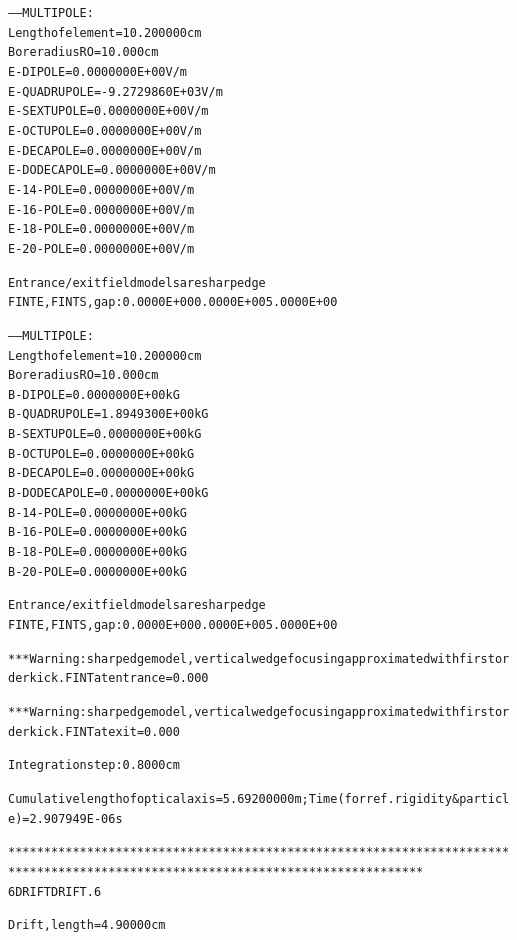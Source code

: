 \begin{tiny}
\begin{center}
\begin{alltt}
      -----  MULTIPOLE   : 
                Length  of  element  =    10.200000      cm
                Bore  radius      RO =    10.000      cm
               E-DIPOLE      =  0.0000000E+00 V/m
               E-QUADRUPOLE  = -9.2729860E+03 V/m
               E-SEXTUPOLE   =  0.0000000E+00 V/m
               E-OCTUPOLE    =  0.0000000E+00 V/m
               E-DECAPOLE    =  0.0000000E+00 V/m
               E-DODECAPOLE  =  0.0000000E+00 V/m
               E-14-POLE     =  0.0000000E+00 V/m
               E-16-POLE     =  0.0000000E+00 V/m
               E-18-POLE     =  0.0000000E+00 V/m
               E-20-POLE     =  0.0000000E+00 V/m

               Entrance/exit field models are sharp edge
               FINTE, FINTS, gap :    0.0000E+00   0.0000E+00   5.0000E+00

      -----  MULTIPOLE   : 
                Length  of  element  =    10.200000      cm
                Bore  radius      RO =    10.000      cm
               B-DIPOLE      =  0.0000000E+00 kG 
               B-QUADRUPOLE  =  1.8949300E+00 kG 
               B-SEXTUPOLE   =  0.0000000E+00 kG 
               B-OCTUPOLE    =  0.0000000E+00 kG 
               B-DECAPOLE    =  0.0000000E+00 kG 
               B-DODECAPOLE  =  0.0000000E+00 kG 
               B-14-POLE     =  0.0000000E+00 kG 
               B-16-POLE     =  0.0000000E+00 kG 
               B-18-POLE     =  0.0000000E+00 kG 
               B-20-POLE     =  0.0000000E+00 kG 

               Entrance/exit field models are sharp edge
               FINTE, FINTS, gap :    0.0000E+00   0.0000E+00   5.0000E+00

  ***  Warning : sharp edge model, vertical wedge focusing approximated with first order kick. FINT at entrance =    0.000    

  ***  Warning : sharp edge model,  vertical wedge focusing approximated with first order kick. FINT at exit =    0.000    

                    Integration step :  0.8000     cm

 Cumulative length of optical axis =    5.69200000     m ;  Time  (for ref. rigidity & particle) =   2.907949E-06 s 

********************************************************************************************************************************
      6  DRIFT       DRIFT.      6         

                              Drift,  length =     4.90000  cm


\end{alltt}
\end{center}
\end{tiny}
